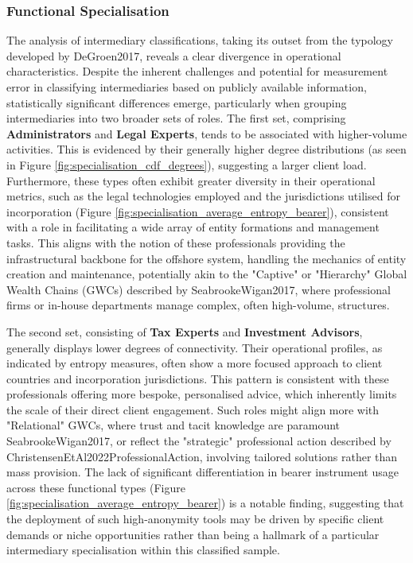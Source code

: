 \subsubsection*{Functional Specialisation}
The analysis of intermediary classifications, taking its outset from the typology developed by DeGroen2017, reveals a clear divergence in operational characteristics. Despite the inherent challenges and potential for measurement error in classifying intermediaries based on publicly available information, statistically significant differences emerge, particularly when grouping intermediaries into two broader sets of roles. The first set, comprising \textbf{Administrators} and \textbf{Legal Experts}, tends to be associated with higher-volume activities. This is evidenced by their generally higher degree distributions (as seen in Figure \ref{fig:specialisation_cdf_degrees}), suggesting a larger client load. Furthermore, these types often exhibit greater diversity in their operational metrics, such as the legal technologies employed and the jurisdictions utilised for incorporation (Figure \ref{fig:specialisation_average_entropy_bearer}), consistent with a role in facilitating a wide array of entity formations and management tasks. This aligns with the notion of these professionals providing the infrastructural backbone for the offshore system, handling the mechanics of entity creation and maintenance, potentially akin to the "Captive" or "Hierarchy" Global Wealth Chains (GWCs) described by SeabrookeWigan2017, where professional firms or in-house departments manage complex, often high-volume, structures.

The second set, consisting of \textbf{Tax Experts} and \textbf{Investment Advisors}, generally displays lower degrees of connectivity. Their operational profiles, as indicated by entropy measures, often show a more focused approach to client countries and incorporation jurisdictions. This pattern is consistent with these professionals offering more bespoke, personalised advice, which inherently limits the scale of their direct client engagement. Such roles might align more with "Relational" GWCs, where trust and tacit knowledge are paramount SeabrookeWigan2017, or reflect the "strategic" professional action described by ChristensenEtAl2022ProfessionalAction, involving tailored solutions rather than mass provision. The lack of significant differentiation in bearer instrument usage across these functional types (Figure \ref{fig:specialisation_average_entropy_bearer}) is a notable finding, suggesting that the deployment of such high-anonymity tools may be driven by specific client demands or niche opportunities rather than being a hallmark of a particular intermediary specialisation within this classified sample.

